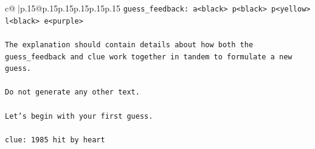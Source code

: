\documentclass{article}
\begin{document}
{\begin{supertabular}{c@{$\;$}|p{.15\linewidth}@{}p{.15\linewidth}p{.15\linewidth}p{.15\linewidth}p{.15\linewidth}p{.15\linewidth}}
{{{\texttt{guess\_feedback: a<black> p<black> p<yellow> l<black> e<purple>} \\
\\ 
\texttt{The explanation should contain details about how both the guess\_feedback and clue work together in tandem to formulate a new guess.} \\
\\ 
\texttt{Do not generate any other text.} \\
\\ 
\texttt{Let's begin with your first guess.} \\
\\ 
\texttt{clue: 1985 hit by heart} \\
            }
        }
    }
     \\ \\


\end{supertabular}}
\end{document}
